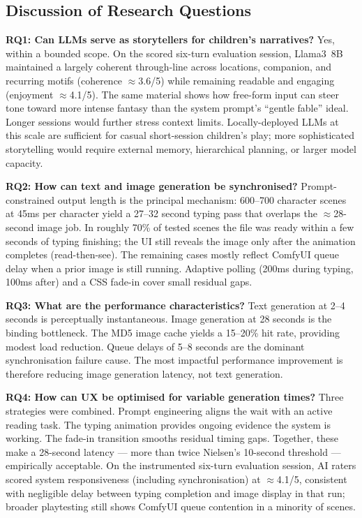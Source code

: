 \documentclass[12pt,a4paper]{article}
\begin{document}
\subsection{Discussion of Research Questions}

\textbf{RQ1: Can LLMs serve as storytellers for children's narratives?} Yes, within a bounded scope. On the scored six-turn evaluation session, Llama3~8B maintained a largely coherent through-line across locations, companion, and recurring motifs (coherence $\approx$3.6/5) while remaining readable and engaging (enjoyment $\approx$4.1/5). The same material shows how free-form input can steer tone toward more intense fantasy than the system prompt's ``gentle fable'' ideal. Longer sessions would further stress context limits. Locally-deployed LLMs at this scale are sufficient for casual short-session children's play; more sophisticated storytelling would require external memory, hierarchical planning, or larger model capacity.

\textbf{RQ2: How can text and image generation be synchronised?} Prompt-constrained output length is the principal mechanism: 600--700 character scenes at 45ms per character yield a 27--32 second typing pass that overlaps the $\approx$28-second image job. In roughly 70\% of tested scenes the file was ready within a few seconds of typing finishing; the UI still reveals the image only after the animation completes (read-then-see). The remaining cases mostly reflect ComfyUI queue delay when a prior image is still running. Adaptive polling (200ms during typing, 100ms after) and a CSS fade-in cover small residual gaps.

\textbf{RQ3: What are the performance characteristics?} Text generation at 2--4 seconds is perceptually instantaneous. Image generation at 28 seconds is the binding bottleneck. The MD5 image cache yields a 15--20\% hit rate, providing modest load reduction. Queue delays of 5--8 seconds are the dominant synchronisation failure cause. The most impactful performance improvement is therefore reducing image generation latency, not text generation.

\textbf{RQ4: How can UX be optimised for variable generation times?} Three strategies were combined. Prompt engineering aligns the wait with an active reading task. The typing animation provides ongoing evidence the system is working. The fade-in transition smooths residual timing gaps. Together, these make a 28-second latency --- more than twice Nielsen's 10-second threshold --- empirically acceptable. On the instrumented six-turn evaluation session, AI raters scored system responsiveness (including synchronisation) at $\approx$4.1/5, consistent with negligible delay between typing completion and image display in that run; broader playtesting still shows ComfyUI queue contention in a minority of scenes.
\end{document}
